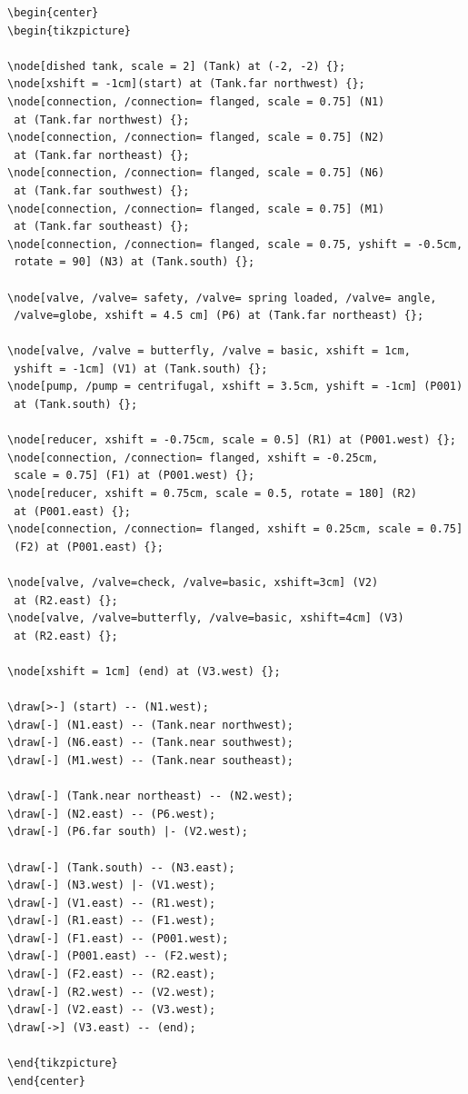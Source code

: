 \begin{lstlisting}[language={[LaTeX]TeX}]
\begin{center}
\begin{tikzpicture}

\node[dished tank, scale = 2] (Tank) at (-2, -2) {};
\node[xshift = -1cm](start) at (Tank.far northwest) {};
\node[connection, /connection= flanged, scale = 0.75] (N1) 
 at (Tank.far northwest) {};
\node[connection, /connection= flanged, scale = 0.75] (N2) 
 at (Tank.far northeast) {};
\node[connection, /connection= flanged, scale = 0.75] (N6) 
 at (Tank.far southwest) {};
\node[connection, /connection= flanged, scale = 0.75] (M1) 
 at (Tank.far southeast) {};
\node[connection, /connection= flanged, scale = 0.75, yshift = -0.5cm, 
 rotate = 90] (N3) at (Tank.south) {};

\node[valve, /valve= safety, /valve= spring loaded, /valve= angle, 
 /valve=globe, xshift = 4.5 cm] (P6) at (Tank.far northeast) {};

\node[valve, /valve = butterfly, /valve = basic, xshift = 1cm, 
 yshift = -1cm] (V1) at (Tank.south) {};
\node[pump, /pump = centrifugal, xshift = 3.5cm, yshift = -1cm] (P001)  
 at (Tank.south) {};

\node[reducer, xshift = -0.75cm, scale = 0.5] (R1) at (P001.west) {};
\node[connection, /connection= flanged, xshift = -0.25cm, 
 scale = 0.75] (F1) at (P001.west) {};
\node[reducer, xshift = 0.75cm, scale = 0.5, rotate = 180] (R2) 
 at (P001.east) {};
\node[connection, /connection= flanged, xshift = 0.25cm, scale = 0.75] 
 (F2) at (P001.east) {};

\node[valve, /valve=check, /valve=basic, xshift=3cm] (V2) 
 at (R2.east) {};
\node[valve, /valve=butterfly, /valve=basic, xshift=4cm] (V3) 
 at (R2.east) {};

\node[xshift = 1cm] (end) at (V3.west) {}; 

\draw[>-] (start) -- (N1.west);
\draw[-] (N1.east) -- (Tank.near northwest);
\draw[-] (N6.east) -- (Tank.near southwest);
\draw[-] (M1.west) -- (Tank.near southeast);

\draw[-] (Tank.near northeast) -- (N2.west);
\draw[-] (N2.east) -- (P6.west);
\draw[-] (P6.far south) |- (V2.west);

\draw[-] (Tank.south) -- (N3.east);
\draw[-] (N3.west) |- (V1.west);
\draw[-] (V1.east) -- (R1.west);
\draw[-] (R1.east) -- (F1.west);
\draw[-] (F1.east) -- (P001.west);
\draw[-] (P001.east) -- (F2.west);
\draw[-] (F2.east) -- (R2.east);
\draw[-] (R2.west) -- (V2.west);
\draw[-] (V2.east) -- (V3.west);
\draw[->] (V3.east) -- (end);

\end{tikzpicture}
\end{center}
\end{lstlisting}